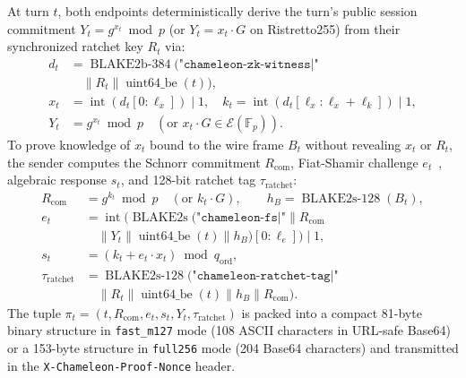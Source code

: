 \documentclass[conference,10pt]{IEEEtran}
\begin{document}
At turn $t$, both endpoints deterministically derive the turn's public session commitment $Y_t = g^{x_t} \bmod p$ (or $Y_t = x_t \cdot G$ on Ristretto255) from their synchronized ratchet key $R_t$ via:
\begin{equation}
\label{eq:zk_witness}
\begin{aligned}
d_t &= \operatorname{BLAKE2b-384}\big(\texttt{"chameleon-zk-witness|"} \\
&\quad \parallel R_t \parallel \operatorname{uint64\_be}(t)\big), \\
x_t &= \operatorname{int}(d_t[0 : \ell_x]) \mid 1, \quad k_t = \operatorname{int}(d_t[\ell_x : \ell_x + \ell_k]) \mid 1, \\
Y_t &= g^{x_t} \bmod p \quad (\text{or } x_t \cdot G \in \mathcal{E}(\mathbb{F}_p)).
\end{aligned}
\end{equation}
To prove knowledge of $x_t$ bound to the wire frame $B_t$ without revealing $x_t$ or $R_t$, the sender computes the Schnorr commitment $R_{\text{com}}$, Fiat-Shamir challenge $e_t$~\cite{fiat1986how, schnorr1991efficient}, algebraic response $s_t$, and 128-bit ratchet tag $\tau_{\text{ratchet}}$:
\begin{equation}
\label{eq:schnorr_prove}
\begin{aligned}
R_{\text{com}} &= g^{k_t} \bmod p \quad (\text{or } k_t \cdot G), \qquad h_B = \operatorname{BLAKE2s-128}(B_t), \\
e_t &= \operatorname{int}\Big(\operatorname{BLAKE2s}\big(\texttt{"chameleon-fs|"} \parallel R_{\text{com}} \\
&\quad \parallel Y_t \parallel \operatorname{uint64\_be}(t) \parallel h_B\big)[0 : \ell_e]\Big) \mid 1, \\
s_t &= (k_t + e_t \cdot x_t) \bmod q_{\text{ord}}, \\
\tau_{\text{ratchet}} &= \operatorname{BLAKE2s-128}\Big(\texttt{"chameleon-ratchet-tag|"} \\
&\quad \parallel R_t \parallel \operatorname{uint64\_be}(t) \parallel h_B \parallel R_{\text{com}}\Big).
\end{aligned}
\end{equation}
The tuple $\pi_t = (t, R_{\text{com}}, e_t, s_t, Y_t, \tau_{\text{ratchet}})$ is packed into a compact 81-byte binary structure in \texttt{fast\_m127} mode (108 ASCII characters in URL-safe Base64) or a 153-byte structure in \texttt{full256} mode (204 Base64 characters) and transmitted in the \texttt{X-Chameleon-Proof-Nonce} header.
\end{document}

